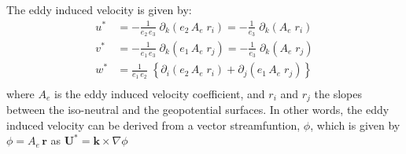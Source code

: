 The eddy induced velocity is given by: 
\begin{equation} \label{Eq_eiv_v}
\begin{split}
 u^* & = - \frac{1}{e_2\,e_{3}}          \;\partial_k \left( e_2 \, A_e \; r_i  \right)   
          = - \frac{1}{e_3}                     \;\partial_k \left(           A_e \; r_i  \right)            \\
 v^* & = - \frac{1}{e_1\,e_3}\;             \partial_k \left( e_1 \, A_e \; r_j  \right)   
          = - \frac{1}{e_3}                     \;\partial_k \left(           A_e \; r_j  \right)             \\
w^* & =    \frac{1}{e_1\,e_2}\; \left\{   \partial_i  \left( e_2 \, A_e \; r_i  \right) 
					              + \partial_j  \left( e_1 \, A_e \;r_j   \right) \right\}   \\
\end{split}
\end{equation}
where $A_{e}$ is the eddy induced velocity coefficient, and $r_i$ and $r_j$ the 
slopes between the iso-neutral and the geopotential surfaces.
 In other words,
the eddy induced velocity can be derived from a vector streamfuntion, $\phi$, which
is given by $\phi = A_e\,\textbf{r}$ as $\textbf{U}^*  = \textbf{k} \times \nabla \phi$

